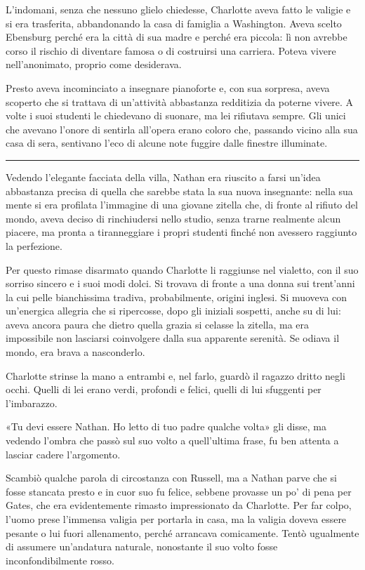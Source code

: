 \documentclass[a4paper,oneside,9pt]{memoir}
\begin{document}
L'indomani, senza che nessuno glielo chiedesse, Charlotte aveva fatto le valigie e si era trasferita, abbandonando la
casa di famiglia a Washington. Aveva scelto Ebensburg perché era la città di sua madre e perché era piccola: lì non
avrebbe corso il rischio di diventare famosa o di costruirsi una carriera. Poteva vivere nell'anonimato, proprio come
desiderava.

Presto aveva incominciato a insegnare pianoforte e, con sua sorpresa, aveva scoperto che si trattava di un'attività
abbastanza redditizia da poterne vivere. A volte i suoi studenti le chiedevano di suonare, ma lei rifiutava sempre. Gli
unici che avevano l'onore di sentirla all'opera erano coloro che, passando vicino alla sua casa di sera, sentivano l'eco
di alcune note fuggire dalle finestre illuminate.

\plainbreak{1}

Vedendo l'elegante facciata della villa, Nathan era riuscito a farsi un'idea abbastanza precisa di quella che sarebbe
stata la sua nuova insegnante: nella sua mente si era profilata l'immagine di una giovane zitella che, di fronte al
rifiuto del mondo, aveva deciso di rinchiudersi nello studio, senza trarne realmente alcun piacere, ma pronta a
tiranneggiare i propri studenti finché non avessero raggiunto la perfezione.

Per questo rimase disarmato quando Charlotte li raggiunse nel vialetto, con il suo sorriso sincero e i suoi modi dolci.
Si trovava di fronte a una donna sui trent'anni la cui pelle bianchissima tradiva, probabilmente, origini inglesi. Si
muoveva con un'energica allegria che si ripercosse, dopo gli iniziali sospetti, anche su di lui: aveva ancora paura che
dietro quella grazia si celasse la zitella, ma era impossibile non lasciarsi coinvolgere dalla sua apparente serenità.
Se odiava il mondo, era brava a nasconderlo.

Charlotte strinse la mano a entrambi e, nel farlo, guardò il ragazzo dritto negli occhi. Quelli di lei erano verdi,
profondi e felici, quelli di lui sfuggenti per l'imbarazzo.

«Tu devi essere Nathan. Ho letto di tuo padre qualche volta» gli disse, ma vedendo l'ombra che passò sul suo volto a
quell'ultima frase, fu ben attenta a lasciar cadere l'argomento.

Scambiò qualche parola di circostanza con Russell, ma a Nathan parve che si fosse stancata presto e in cuor suo fu
felice, sebbene provasse un po' di pena per Gates, che era evidentemente rimasto impressionato da Charlotte. Per far
colpo, l'uomo prese l'immensa valigia per portarla in casa, ma la valigia doveva essere pesante o lui fuori allenamento,
perché arrancava comicamente. Tentò ugualmente di assumere un'andatura naturale, nonostante il suo volto fosse
inconfondibilmente rosso.
\end{document}
